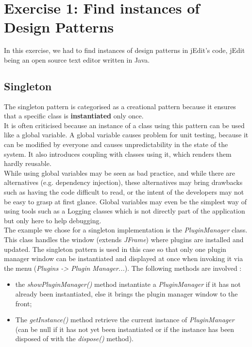 \section{Exercise 1: Find instances of Design Patterns}

In this exercise, we had to find instances of design patterns in jEdit's
code, jEdit being an open source text editor written in Java.

\subsection{Singleton}
The singleton pattern is categorised as a creational pattern because it
ensures that a specific class is \textbf{instantiated} only once.\\

It is often criticised because an instance of a class using this pattern
can be used like a global variable. A global variable causes problem for
unit testing, because it can be modified by everyone and causes
unpredictability in the state of the system. It also introduces coupling
with classes using it, which renders them hardly reusable.\\

While using global variables may be seen as bad practice, and while
there are alternatives (e.g. dependency injection), these alternatives
may bring drawbacks such as having the code difficult to read, or the
intent of the developers may not be easy to grasp at first glance.
Global variables may even be the simplest way of using tools such as a
Logging classes which is not directly part of the application but only
here to help debugging. \cite{cite:plSingletonGlobal} \cite{cite:soSingleton}
\cite{cite:seGlobal}\\

The example we chose for a singleton implementation is the
\emph{PluginManager}\footnotemark[1]{} class.
This class handles the window (extends \emph{JFrame}) where plugins are
installed and updated. The singleton pattern is used in this
case so that only one plugin manager window can be instantiated and
displayed at once when invoking it via the menu (\emph{Plugins -> Plugin
Manager...}). The following methods are involved :


\begin{itemize}\itemsep1pt
    \item the \emph{showPluginManager()} method instantiate a \emph{PluginManager}
    if it has not already been instantiated, else it brings the plugin manager
    window to the front;

    \item The \emph{getInstance()} method retrieve the current instance of
    \emph{PluginManager} (can be null if it has not yet been instantiated or if
    the instance has been disposed of with the \emph{dispose()} method).
\end{itemize}

